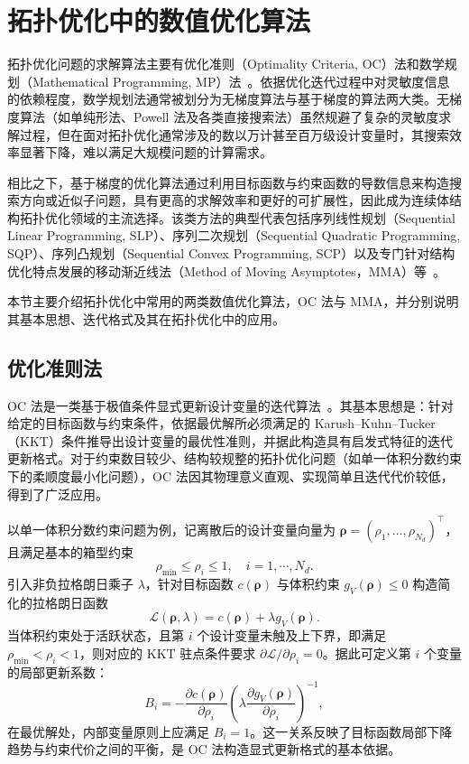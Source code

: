 \section{拓扑优化中的数值优化算法}
\label{sec:num_algorithms}

拓扑优化问题的求解算法主要有优化准则（Optimality Criteria, OC）法和数学规划（Mathematical Programming, MP）法~\cite{GongChengJieGouYouHuaSheJiJiChuChengGengDongBianZhu2012}。依据优化迭代过程中对灵敏度信息的依赖程度，数学规划法通常被划分为无梯度算法与基于梯度的算法两大类。无梯度算法（如单纯形法、Powell 法及各类直接搜索法）虽然规避了复杂的灵敏度求解过程，但在面对拓扑优化通常涉及的数以万计甚至百万级设计变量时，其搜索效率显著下降，难以满足大规模问题的计算需求。

相比之下，基于梯度的优化算法通过利用目标函数与约束函数的导数信息来构造搜索方向或近似子问题，具有更高的求解效率和更好的可扩展性，因此成为连续体结构拓扑优化领域的主流选择。该类方法的典型代表包括序列线性规划（Sequential Linear Programming, SLP）、序列二次规划（Sequential Quadratic Programming, SQP）、序列凸规划（Sequential Convex Programming, SCP）以及专门针对结构优化特点发展的移动渐近线法（Method of Moving Asymptotes，MMA）等~\cite{qianApproachStructuralOptimization1984, svanbergMethodMovingAsymptotes1987, boggsSequentialQuadraticProgramming1995}。

本节主要介绍拓扑优化中常用的两类数值优化算法，OC 法与 MMA，并分别说明其基本思想、迭代格式及其在拓扑优化中的应用。


\subsection{优化准则法}
\label{subsec:alg_oc}

OC 法是一类基于极值条件显式更新设计变量的迭代算法~\cite{saveStructuralOptimizationVolume1986}。其基本思想是：针对给定的目标函数与约束条件，依据最优解所必须满足的 Karush–Kuhn–Tucker（KKT）条件推导出设计变量的最优性准则，并据此构造具有启发式特征的迭代更新格式。对于约束数目较少、结构较规整的拓扑优化问题（如单一体积分数约束下的柔顺度最小化问题），OC 法因其物理意义直观、实现简单且迭代代价较低，得到了广泛应用。

以单一体积分数约束问题为例，记离散后的设计变量向量为 $\boldsymbol{\rho} = (\rho_1,\dots,\rho_{N_d})^\top$，且满足基本的箱型约束 
\[
\rho_{\min} \le \rho_i \le 1,\quad{i}=1,\cdots,N_d.
\]
引入非负拉格朗日乘子 $\lambda$，针对目标函数 $c(\boldsymbol{\rho})$ 与体积约束 $g_V(\boldsymbol{\rho}) \le 0$ 构造简化的拉格朗日函数
\[
\mathcal{L}(\boldsymbol{\rho},\lambda) = c(\boldsymbol{\rho}) + \lambda{g}_V(\boldsymbol{\rho}).
\]
当体积约束处于活跃状态，且第 $i$ 个设计变量未触及上下界，即满足 $\rho_{\min} < \rho_i < 1$，则对应的 KKT 驻点条件要求 $\partial\mathcal{L}/\partial\rho_i = 0$。据此可定义第 $i$ 个变量的局部更新系数：
\[
B_i = -\frac{\partial{c}(\boldsymbol{\rho})}{\partial\rho_i}\left(\lambda\frac{\partial{g}_V(\boldsymbol{\rho})}{\partial\rho_i}\right)^{-1},
\]
在最优解处，内部变量原则上应满足 $B_i = 1$。这一关系反映了目标函数局部下降趋势与约束代价之间的平衡，是 OC 法构造显式更新格式的基本依据。

